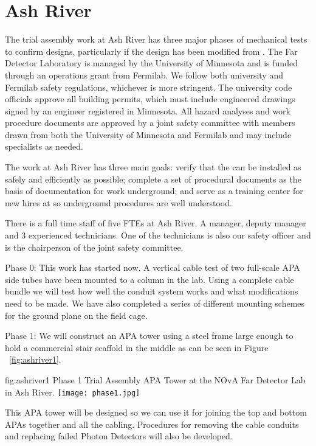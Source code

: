 \section{Ash River}

The trial assembly work at Ash River has three major phases of 
mechanical tests to confirm designs, particularly if the design has been modified from .  The  Far Detector Laboratory is managed by
the University of Minnesota and is funded through an
operations grant from Fermilab.  We follow both university and Fermilab
safety regulations, whichever is more stringent.  The university code
officials approve all building permits, which must include engineered
drawings signed by an engineer registered in Minnesota. All hazard
analyses and work procedure documents are approved by a joint safety
committee with members drawn from both the University of Minnesota and Fermilab and may include specialists as needed.

The work at Ash River has three main goals: verify that
the   can be installed as safely and efficiently as possible; complete a set of procedural documents as the basis of
documentation for work underground; and serve as a training center for new
hires at \surf so underground procedures are well understood.

There is a full time staff of five FTEs  at Ash River. A manager,
deputy manager and 3 experienced technicians.  One of the technicians
is also our safety officer and is the chairperson of the joint safety
committee.


Phase 0: This work has started now.  A vertical cable test of two
full-scale APA side tubes have been mounted to a column in the
lab. Using a complete cable bundle we will test how well the conduit
system works and what modifications need to be made. We have also
completed a series of different mounting schemes for the ground plane
on the field cage.

Phase 1: We will construct an APA tower using a steel frame large
enough to hold a commercial stair scaffold in the middle as can be
seen in Figure ~\ref{fig:ashriver1}.
\begin{dunefigure}{fig:ashriver1}
  {Phase 1 Trial Assembly APA Tower at the NOvA Far Detector Lab in Ash River.}
  \texttt{[image: phase1.jpg]}
\end{dunefigure}
This APA tower will be designed so we can
use it for joining the top and bottom APAs together and all the
cabling. Procedures for removing the cable conduits and replacing
failed Photon Detectors will also be developed.

